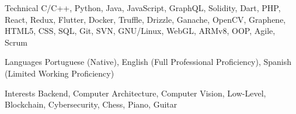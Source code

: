 
\begin{cvskills}
  \cvskill
    {Technical} %
    {C/C++, Python, Java, JavaScript, GraphQL, Solidity, Dart, PHP, React, Redux, Flutter, Docker, Truffle, Drizzle, Ganache, OpenCV, Graphene, HTML5, CSS, SQL, Git, SVN, GNU/Linux, WebGL, ARMv8, OOP, Agile, Scrum} %

  \cvskill
    {Languages} %
    {Portuguese (Native), English (Full Professional Proficiency), Spanish (Limited Working Proficiency)} %

  \cvskill
    {Interests} %
    {Backend, Computer Architecture, Computer Vision, Low-Level, Blockchain, Cybersecurity, Chess, Piano, Guitar} %
\end{cvskills}
